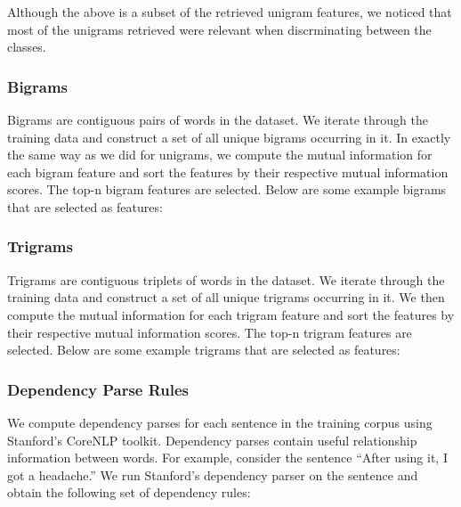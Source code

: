 \documentclass{acm_proc_article-sp}
\begin{document}
\noindent{}

Although the above is a subset of the retrieved unigram features, we noticed that most of the unigrams retrieved were relevant when discrminating between the classes.

\subsubsection{Bigrams}
Bigrams are contiguous pairs of words in the dataset. We iterate through the training data and construct a set of all unique bigrams occurring in it. In exactly the same way as we did for unigrams, we compute the mutual information for each bigram feature and sort the features by their respective mutual information scores. The top-n bigram features are selected. Below are some example bigrams that are selected as features:

\noindent{}

\subsubsection{Trigrams}
Trigrams are contiguous triplets of words in the dataset. We iterate through the training data and construct a set of all unique trigrams occurring in it. We then compute the mutual information for each trigram feature and sort the features by their respective mutual information scores. The top-n trigram features are selected. Below are some example trigrams that are selected as features:

\noindent{}

\subsubsection{Dependency Parse Rules}
We compute dependency parses for each sentence in the training corpus using Stanford's CoreNLP toolkit. Dependency parses contain useful relationship information between words. For example, consider the sentence ``After using it, I got a headache.'' We run Stanford's dependency parser on the sentence and obtain the following set of dependency rules:
\end{document}
